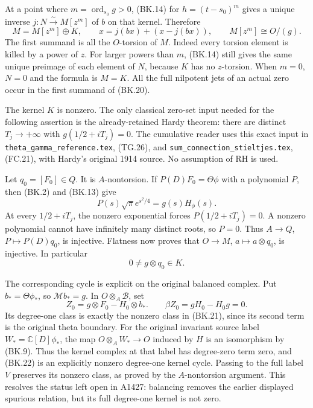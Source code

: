 At a point where $m=\operatorname{ord}_{s_0}g>0$, (BK.14) for
$h=(t-s_0)^m$ gives a unique inverse
$j:N\xrightarrow{\sim}M[z^m]$ of $b$ on that kernel.  Therefore
\[
 M=M[z^m]\oplus K,\qquad
 x=j(bx)+(x-j(bx)),\qquad M[z^m]\cong O/(g).   \tag{BK.20}
\]
The first summand is all the $O$-torsion of $M$.  Indeed every
torsion element is killed by a power of $z$.  For larger powers
than $m$, (BK.14) still gives the same unique preimage of each
element of $N$, because $K$ has no $z$-torsion.  When $m=0$,
$N=0$ and the formula is $M=K$.  All the full nilpotent jets of
an actual zero occur in the first summand of (BK.20).

The kernel $K$ is nonzero.  The only classical zero-set input needed
for the following assertion is the already-retained Hardy theorem:
there are distinct $T_j\to+\infty$ with
$g(1/2+iT_j)=0$.  The cumulative reader uses this exact input in
\texttt{theta\_gamma\_reference.tex}, (TG.26), and
\texttt{sum\_connection\_stieltjes.tex}, (FC.21), with Hardy's
original 1914 source.  No assumption of RH is used.

Let $q_0=[F_0]\in Q$.  It is $A$-nontorsion.  If
$P(D)F_0=\Theta\phi$ with a polynomial $P$, then (BK.2) and
(BK.13) give
\[
 P(s)\sqrt\pi e^{s^2/4}=g(s)H_\phi(s).
\]
At every $1/2+iT_j$, the nonzero exponential forces $P(1/2+iT_j)=0$.
A nonzero polynomial cannot have infinitely many distinct roots,
so $P=0$.  Thus $A\to Q$, $P\mapsto P(D)q_0$, is injective.
Flatness now proves that $O\to M$, $a\mapsto a\otimes q_0$,
is injective.  In particular
\[
 0\ne g\otimes q_0\in K.                       \tag{BK.21}
\]

The corresponding cycle is explicit on the original balanced complex.
Put $b_*=\Theta\phi_*$, so $\mathcal Mb_*=g$.  In
$O\otimes_A\mathscr B$, set
\[
 Z_0=g\otimes F_0-H_0\otimes b_*.
 \qquad \beta Z_0=gH_0-H_0g=0.                 \tag{BK.22}
\]
Its degree-one class is exactly the nonzero class in (BK.21),
since its second term is the original theta boundary.  For the
original invariant source label $W_*=\mathbb C[D]\phi_*$,
the map $O\otimes_AW_*\to O$ induced by $H$ is an isomorphism
by (BK.9).  Thus the kernel complex at that label has degree-zero
term zero, and (BK.22) is an explicitly nonzero degree-one kernel
cycle.  Passing to the full label $V$ preserves its nonzero class,
as proved by the $A$-nontorsion argument.  This resolves the status
left open in A1427: balancing removes the earlier displayed
spurious relation, but its full degree-one kernel is not zero.

